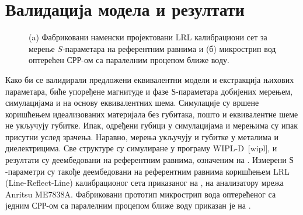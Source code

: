 \section{Валидација модела и резултати}

\begin{figure}[!t]
\centering
{}\hfill
{}
\caption{(a) Фабриковани наменски пројектовани LRL калибрациони сет за мерење $S$-параметара на референтним равнима и (б) микрострип вод оптерећен СРР-ом са паралелним процепом ближе воду.} 
\label{f9}
\end{figure}
Како би се валидирали предложени еквивалентни модели и екстракција њихових параметара, биће упоређене магнитуде и фазе $Ѕ$-параметара добијених мерењем, симулацијама и на основу еквивалентних шема. Симулације су вршене коришћењем идеализованих материјала без губитака, пошто и еквивалентне шеме не укључују губитке. Ипак, одређени губици у симулацијама и мерењима су ипак присутни услед зрачења. Наравно, мерења укључују и губитке у металима и диелектрицима. Све структуре су симулиране у програму WIPL-D~[wipl], и резултати су деембедовани на референтним равнима, означеним на . Измерени $Ѕ$-параметри су такође деембедовани на референтним равнима коришћењем LRL (Line-Reflect-Line) калибрационог сета приказаног на , на анализатору мрежа Anritsu ME7838A. Фабриковани прототип микрострип вода оптерећеног са једним СРР-ом са паралелним процепом ближе воду приказан је на .

